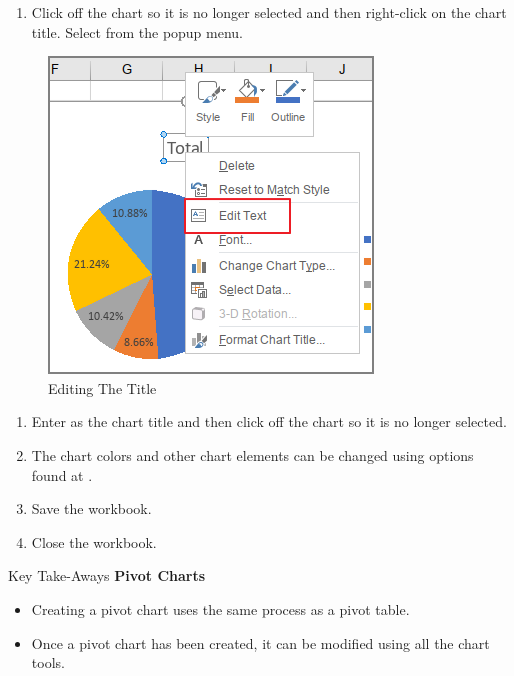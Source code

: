 \begin{enumerate}[resume]	
	\item Click off the chart so it is no longer selected and then right-click on the chart title. Select  from the popup menu.
\end{enumerate}

\begin{figure}[H]
	\centering
	\includegraphics[width=\maxwidth{.75\linewidth}]{gfx/ch07_fig32}
	\caption{Editing The Title}
	\label{07:fig32}
\end{figure}

\begin{enumerate}[resume]	
	\item Enter  as the chart title and then click off the chart so it is no longer selected.
	\item The chart colors and other chart elements can be changed using options found at .
	\item Save the  workbook.
	\item Close the  workbook.
\end{enumerate}

\begin{center}
	\begin{tkwbox}{Key Take-Aways}
		\textbf{Pivot Charts}
		\\
		\begin{itemize}
			\setlength{\itemsep}{0pt}
			\setlength{\parskip}{0pt}
			\setlength{\parsep}{0pt}
			
			\item Creating a pivot chart uses the same process as a pivot table.
			\item Once a pivot chart has been created, it can be modified using all the chart tools.
			
		\end{itemize}
	\end{tkwbox}
\end{center}

